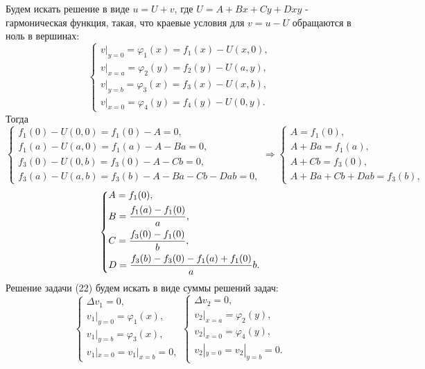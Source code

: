 \documentclass[11pt]{article}
\begin{document}
Будем искать решение в виде $u = U + v$, где $U = A + Bx + Cy + Dxy$ - гармоническая функция,
такая, что краевые условия для $v = u - U$ обращаются в ноль в вершинах:
\begin{equation}
\begin{cases}
v|_{y = 0} = \varphi_1(x) = f_1(x) - U(x, 0), \\
v|_{x = a} = \varphi_2(y) = f_2(y) - U(a, y), \\
v|_{y = b} = \varphi_3(x) = f_3(x) - U(x, b), \\
v|_{x = 0} = \varphi_4(y) = f_4(y) - U(0, y).
\end{cases}
\end{equation}
Тогда
\begin{equation*}
\begin{cases}
f_1(0) - U(0, 0) = f_1(0) - A = 0, \\
f_1(a) - U(a, 0) = f_1(a) - A - Ba = 0, \\
f_3(0) - U(0, b) = f_3(0) - A - Cb = 0, \\
f_3(a) - U(a, b) = f_3(b) - A - Ba - Cb - Dab = 0,
\end{cases}
\Rightarrow
\begin{cases}
A = f_1(0), \\
A + Ba = f_1(a), \\
A + Cb = f_3(0), \\
A + Ba + Cb + Dab = f_3(b),
\end{cases}
\end{equation*}
\begin{equation}
\begin{dcases}
A = f_1(0), \\
B = \frac{f_1(a) - f_1(0)}a, \\
C = \frac{f_3(0) - f_1(0)}b, \\
D = \frac{f_3(b) - f_3(0) - f_1(a) + f_1(0)}ab.
\end{dcases}
\end{equation}
Решение задачи (22) будем искать в виде суммы решений задач:
\begin{equation}
\begin{cases}
\Delta v_1 = 0, \\
v_1|_{y = 0} = \varphi_1(x), \\
v_1|_{y = b} = \varphi_3(x), \\
v_1|_{x = 0} = v_1|_{x = b} = 0,
\end{cases}
\begin{cases}
\Delta v_2 = 0, \\
v_2|_{x = a} = \varphi_2(y), \\
v_2|_{x = 0} = \varphi_4(y), \\
v_2|_{y = 0} = v_2|_{y = b} = 0.
\end{cases}
\end{equation}
\end{document}
